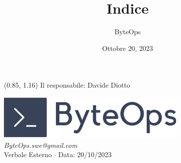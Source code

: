 \documentclass{article}
\title{\textbf{\fontsize{28}{6}\selectfont Indice}}
\author{\fontsize{14}{6}\selectfont ByteOps}
\date{Ottobre 20, 2023}
\begin{document}
\begin{textblock*}{\textwidth}(0.85\textwidth, 1.16\textheight)
    Il responsabile: Davide Diotto
\end{textblock*}

\pagestyle{fancy}
\begin{center}
\includegraphics[width = 0.7\textwidth]{../../Images/logo.png} \\
\vspace{0.2cm}
\textcolor[RGB]{60, 60, 60}{\textit{ByteOps.swe@gmail.com}} \\
\vspace{1cm}
\fontsize{16}{6}\selectfont Verbale Esterno $\cdot$ Data: 20/10/2023 \\
\vspace{0.5cm}
\end{center}
\end{document}
